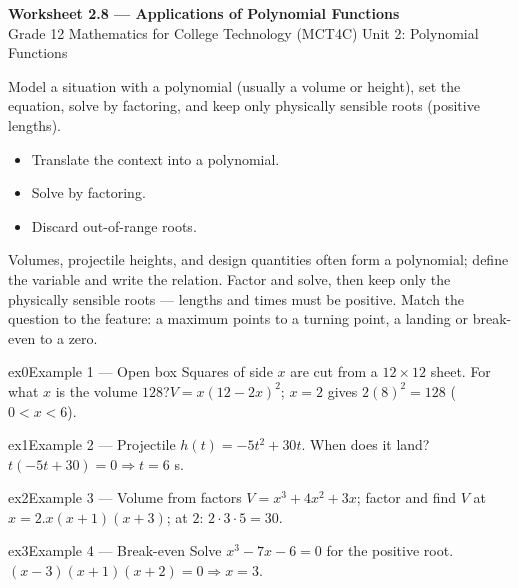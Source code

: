 \documentclass[11pt]{article}
\begin{document}
\begin{center}
{\LARGE\bfseries\color{titleblue}Worksheet 2.8 --- Applications of Polynomial Functions}\\[2pt]
{\small Grade 12 Mathematics for College Technology (MCT4C) \textperiodcentered{} Unit 2: Polynomial Functions}
\end{center}

\begin{ideabox}
Model a situation with a polynomial (usually a volume or height), set the equation, solve by factoring, and keep only physically sensible roots (positive lengths).
\begin{itemize}[leftmargin=*,itemsep=2pt]
  \item Translate the context into a polynomial.
  \item Solve by factoring.
  \item Discard out-of-range roots.
\end{itemize}
\end{ideabox}

\begin{learnbox}
Volumes, projectile heights, and design quantities often form a polynomial; define the variable and write the relation.
Factor and solve, then keep only the physically sensible roots — lengths and times must be positive.
Match the question to the feature: a maximum points to a turning point, a landing or break-even to a zero.
\end{learnbox}


\begin{example}{ex0}{Example 1 --- Open box}
Squares of side $x$ are cut from a $12\times12$ sheet. For what $x$ is the volume $128$?\soln $V=x(12-2x)^2$; $x=2$ gives $2(8)^2=128$ ($0<x<6$).
\end{example}

\begin{example}{ex1}{Example 2 --- Projectile}
$h(t)=-5t^2+30t$. When does it land?\soln $t(-5t+30)=0\Rightarrow t=6$ s.
\end{example}

\begin{example}{ex2}{Example 3 --- Volume from factors}
$V=x^3+4x^2+3x$; factor and find $V$ at $x=2$.\soln $x(x+1)(x+3)$; at $2$: $2\cdot3\cdot5=30$.
\end{example}

\begin{example}{ex3}{Example 4 --- Break-even}
Solve $x^3-7x-6=0$ for the positive root.\soln $(x-3)(x+1)(x+2)=0\Rightarrow x=3$.
\end{example}
\end{document}
